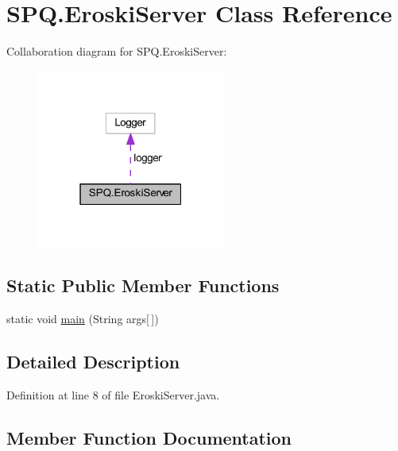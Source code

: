 \hypertarget{class_s_p_q_1_1_eroski_server}{}\section{S\+P\+Q.\+Eroski\+Server Class Reference}
\label{class_s_p_q_1_1_eroski_server}


Collaboration diagram for S\+P\+Q.\+Eroski\+Server\+:
\nopagebreak
\begin{figure}[H]
\begin{center}
\leavevmode
\includegraphics[width=175pt]{class_s_p_q_1_1_eroski_server__coll__graph}
\end{center}
\end{figure}
\subsection*{Static Public Member Functions}
\begin{DoxyCompactItemize}
\item 
static void \mbox{\hyperlink{class_s_p_q_1_1_eroski_server_abd0f9fcb4551a071324e502582e46425}{main}} (String args\mbox{[}$\,$\mbox{]})
\end{DoxyCompactItemize}


\subsection{Detailed Description}


Definition at line 8 of file Eroski\+Server.\+java.



\subsection{Member Function Documentation}
\mbox{\label{class_s_p_q_1_1_eroski_server_abd0f9fcb4551a071324e502582e46425}} 

